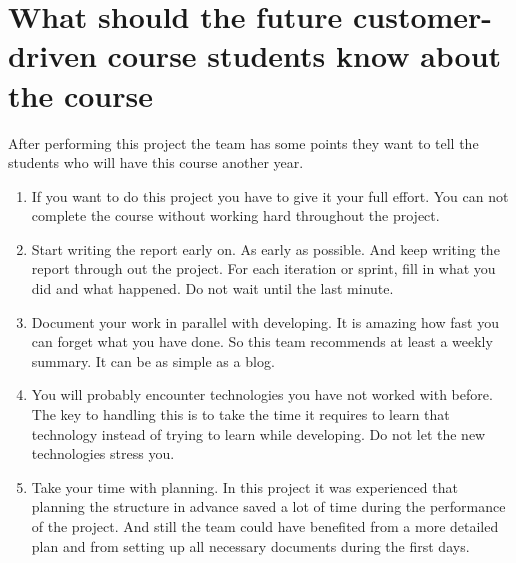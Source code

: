 \section{What should the future customer-driven course students know about the course}
After performing this project the team has some points they want to tell the students who will have this course another year. 
\begin{enumerate}
    \item If you want to do this project you have to give it your full effort. You can not complete the course without working hard throughout the project.
    
    \item Start writing the report early on. As early as possible. And keep writing the report through out the project. For each iteration or sprint, fill in what you did and what happened. Do not wait until the last minute.
    
    \item Document your work in parallel with developing. It is amazing how fast you can forget what you have done. So this team recommends at least a weekly summary. It can be as simple as a blog.
    
    \item You will probably encounter technologies you have not worked with before. The key to handling this is to take the time it requires to learn that technology instead of trying to learn while developing. Do not let the new technologies stress you.
    
    \item Take your time with planning. In this project it was experienced that planning the structure in advance saved a lot of time during the performance of the project. And still the team could have benefited from a more detailed plan and from setting up all necessary documents during the first days.

\end{enumerate}